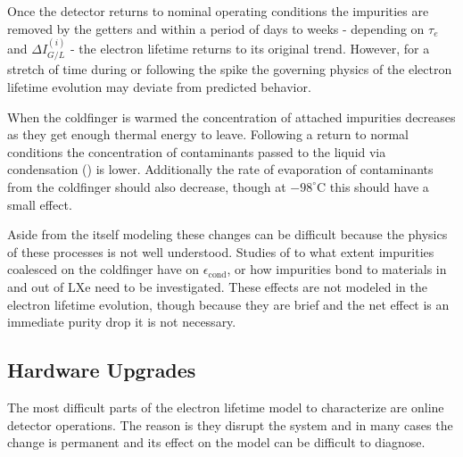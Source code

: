 Once the detector returns to nominal operating conditions the impurities are removed by the getters and within a period of days to
weeks - depending on $\tau_e$ and $\Delta I_{G/L}^{(i)}$ - the electron lifetime returns to its original trend.  However, for a stretch of
time during or following the spike the governing physics of the electron lifetime evolution may deviate from predicted behavior.

When the coldfinger is warmed the concentration of attached impurities decreases as they get enough thermal energy to leave.  Following
a return to normal conditions the concentration of contaminants passed to the liquid via condensation
() is lower.  Additionally the rate of evaporation of contaminants from
the coldfinger should also decrease, though at $-98^{\circ} \mathrm{C}$ this should have a small effect.

Aside from the itself modeling these changes can be difficult because the physics of these processes is not well understood.  Studies
of to what extent impurities coalesced on the coldfinger have on $\epsilon_{\mathrm{cond}}$, or how impurities bond to materials in and
out of LXe need to be investigated.  These effects are not modeled in the electron lifetime evolution, though because they are brief and
the net effect is an immediate purity drop it is not necessary.



\subsection{Hardware Upgrades}
\label{subsec:electron_lifetime_model_ops}
The most difficult parts of the electron lifetime model to characterize are online detector operations.  The reason is they disrupt the
system and in many cases the change is permanent and its effect on the model can be difficult to diagnose.

